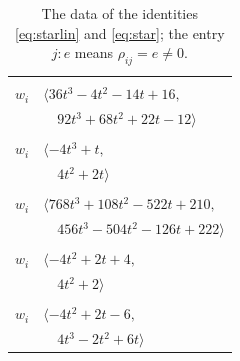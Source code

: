 \documentclass[11pt]{article}
\begin{document}
\begingroup\scriptsize
\setlength{\LTcapwidth}{\textwidth}
\begin{longtable}{@{}ll@{}}
\caption{The data of the identities \eqref{eq:starlin} and \eqref{eq:star}; the entry $j{:}e$ means $\rho_{ij}=e\neq0$.}\label{tab:star}\\
\hline\endfirsthead\hline\endhead\hline\endfoot
\multicolumn{2}{@{}p{0.97\textwidth}@{}}{$i=0$, $D_i=8$, $\rho_{ij}$: $8{:}1, \allowbreak 11{:}1, \allowbreak 12{:}2, \allowbreak 26{:}2, \allowbreak 43{:}1, \allowbreak 44{:}1, \allowbreak 45{:}2, \allowbreak 52{:}1, \allowbreak 54{:}1, \allowbreak 63{:}1$}\\
$w_i$ & $\langle 36t^{3}-4t^{2}-14t+16,$\\
 & $\quad 92t^{3}+68t^{2}+22t-12\rangle$\\
\addlinespace[2pt]
\multicolumn{2}{@{}p{0.97\textwidth}@{}}{$i=1$, $D_i=1$, $\rho_{ij}$: $8{:}1, \allowbreak 25{:}1, \allowbreak 28{:}1, \allowbreak 49{:}2, \allowbreak 59{:}2$}\\
$w_i$ & $\langle -4t^{3}+t,$\\
 & $\quad 4t^{2}+2t\rangle$\\
\addlinespace[2pt]
\multicolumn{2}{@{}p{0.97\textwidth}@{}}{$i=2$, $D_i=16$, $\rho_{ij}$: $10{:}1, \allowbreak 12{:}2, \allowbreak 14{:}1, \allowbreak 15{:}2, \allowbreak 16{:}2, \allowbreak 17{:}1, \allowbreak 18{:}1, \allowbreak 24{:}2, \allowbreak 27{:}1, \allowbreak 37{:}1, \allowbreak 43{:}1, \allowbreak 45{:}2, \allowbreak 46{:}2, \allowbreak 53{:}1, \allowbreak 56{:}1, \allowbreak 58{:}1, \allowbreak 60{:}1, \allowbreak 61{:}2, \allowbreak 62{:}1$}\\
$w_i$ & $\langle 768t^{3}+108t^{2}-522t+210,$\\
 & $\quad 456t^{3}-504t^{2}-126t+222\rangle$\\
\addlinespace[2pt]
\multicolumn{2}{@{}p{0.97\textwidth}@{}}{$i=3$, $D_i=2$, $\rho_{ij}$: $11{:}1, \allowbreak 17{:}2, \allowbreak 18{:}2, \allowbreak 59{:}1$}\\
$w_i$ & $\langle -4t^{2}+2t+4,$\\
 & $\quad 4t^{2}+2\rangle$\\
\addlinespace[2pt]
\multicolumn{2}{@{}p{0.97\textwidth}@{}}{$i=4$, $D_i=2$, $\rho_{ij}$: $6{:}2, \allowbreak 7{:}1, \allowbreak 23{:}1, \allowbreak 27{:}2, \allowbreak 45{:}1, \allowbreak 48{:}2, \allowbreak 54{:}2, \allowbreak 57{:}1$}\\
$w_i$ & $\langle -4t^{2}+2t-6,$\\
 & $\quad 4t^{3}-2t^{2}+6t\rangle$\\

\end{longtable}
\end{document}
